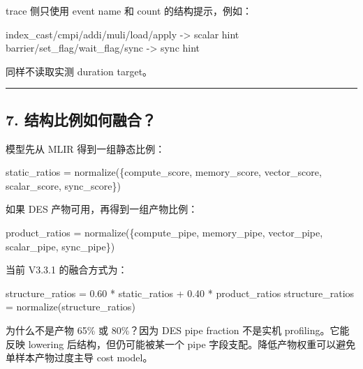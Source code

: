 \documentclass[
  10pt,
]{article}
\newenvironment{Shaded}{}{}
\newcommand{\NormalTok}[1]{#1}
\begin{document}
trace 侧只使用 event name 和 count 的结构提示，例如：

\begin{Shaded}
\begin{Highlighting}[]
\NormalTok{index\_cast/cmpi/addi/muli/load/apply {-}\textgreater{} scalar hint}
\NormalTok{barrier/set\_flag/wait\_flag/sync      {-}\textgreater{} sync hint}
\end{Highlighting}
\end{Shaded}

同样不读取实测 duration target。

\begin{center}\rule{0.5\linewidth}{0.5pt}\end{center}

\subsection{7.
结构比例如何融合？}\label{ux7ed3ux6784ux6bd4ux4f8bux5982ux4f55ux878dux5408}

模型先从 MLIR 得到一组静态比例：

\begin{Shaded}
\begin{Highlighting}[]
\NormalTok{static\_ratios = normalize(\{compute\_score, memory\_score, vector\_score, scalar\_score, sync\_score\})}
\end{Highlighting}
\end{Shaded}

如果 DES 产物可用，再得到一组产物比例：

\begin{Shaded}
\begin{Highlighting}[]
\NormalTok{product\_ratios = normalize(\{compute\_pipe, memory\_pipe, vector\_pipe, scalar\_pipe, sync\_pipe\})}
\end{Highlighting}
\end{Shaded}

当前 V3.3.1 的融合方式为：

\begin{Shaded}
\begin{Highlighting}[]
\NormalTok{structure\_ratios = 0.60 * static\_ratios + 0.40 * product\_ratios}
\NormalTok{structure\_ratios = normalize(structure\_ratios)}
\end{Highlighting}
\end{Shaded}

为什么不是产物 65\% 或 80\%？因为 DES pipe fraction 不是实机
profiling。它能反映 lowering 后结构，但仍可能被某一个 pipe
字段支配。降低产物权重可以避免单样本产物过度主导 cost model。
\end{document}
